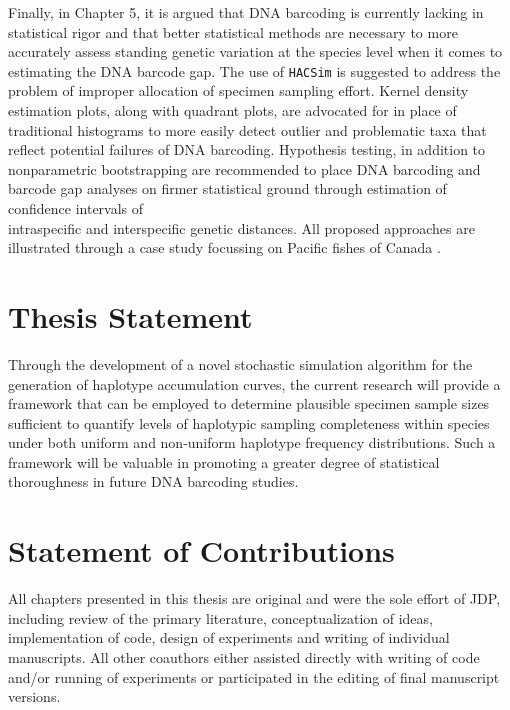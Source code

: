 \vspace{5mm}

Finally, in Chapter 5, it is argued that DNA barcoding is currently lacking in statistical rigor and that better statistical methods are necessary to more accurately assess standing genetic variation at the species level when it comes to estimating the DNA barcode gap. The use of {\tt HACSim} is suggested to address the problem of improper allocation of specimen sampling effort. Kernel density estimation plots, along with quadrant plots, are advocated for in place of traditional histograms to more easily detect outlier and problematic taxa that reflect potential failures of DNA barcoding. Hypothesis testing, in addition to \\ nonparametric bootstrapping are recommended to place DNA barcoding and barcode gap analyses on firmer statistical ground through estimation of confidence intervals of \\ intraspecific and interspecific genetic distances. All proposed approaches are illustrated through a case study focussing on Pacific fishes of Canada \cite{steinke2009dna}.

\vspace{5mm}

\section{Thesis Statement}

Through the development of a novel stochastic simulation algorithm for the generation of haplotype accumulation curves, the current research will provide a framework that can be employed to determine plausible specimen sample sizes sufficient to quantify levels of haplotypic sampling completeness within species under both uniform and non-uniform haplotype frequency distributions. Such a framework will be valuable in promoting a greater degree of statistical thoroughness in future DNA barcoding studies. 

\vspace{5mm}

\section{Statement of Contributions}
  
All chapters presented in this thesis are original and were the sole effort of JDP, \\ including review of the primary literature, conceptualization of ideas, implementation of code, design of experiments and writing of individual manuscripts. All other coauthors either assisted directly with writing of code and/or running of experiments or participated in the editing of final manuscript versions.

